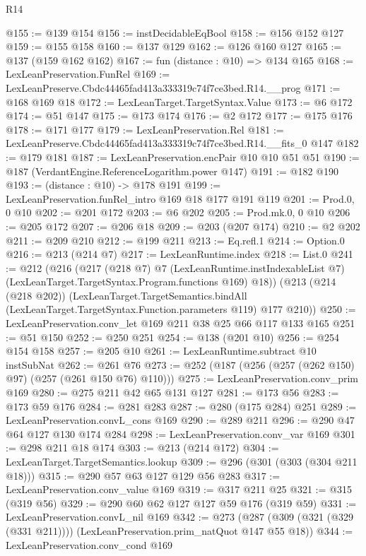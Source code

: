 \begin{lexlean}{R14}
\begin{coremodule}
@155 := @139 @154
@156 := instDecidableEqBool
@158 := @156 @152 @127
@159 := @155 @158
@160 := @137 @129
@162 := @126 @160 @127
@165 := @137 (@159 @162 @162)
@167 := fun (distance : @10) => @134 @165
@168 := LexLeanPreservation.FunRel
@169 := LexLeanPreserve.Cbdc44465fad413a333319c74f7ce3bed.R14.__prog
@171 := @168 @169 @18
@172 := LexLeanTarget.TargetSyntax.Value
@173 := @6 @172
@174 := @51 @147
@175 := @173 @174
@176 := @2 @172
@177 := @175 @176
@178 := @171 @177
@179 := LexLeanPreservation.Rel
@181 := LexLeanPreserve.Cbdc44465fad413a333319c74f7ce3bed.R14.__fits_0 @147
@182 := @179 @181
@187 := LexLeanPreservation.encPair @10 @10 @51 @51
@190 := @187 (VerdantEngine.ReferenceLogarithm.power @147)
@191 := @182 @190
@193 := (distance : @10) -> @178 @191
@199 := LexLeanPreservation.funRel_intro @169 @18 @177 @191 @119
@201 := Prod.{0, 0} @10
@202 := @201 @172
@203 := @6 @202
@205 := Prod.mk.{0, 0} @10
@206 := @205 @172
@207 := @206 @18
@209 := @203 (@207 @174)
@210 := @2 @202
@211 := @209 @210
@212 := @199 @211
@213 := Eq.refl.{1}
@214 := Option.{0}
@216 := @213 (@214 @7)
@217 := LexLeanRuntime.index
@218 := List.{0}
@241 := @212
    (@216
      (@217
        (@218 @7)
        @7
        (LexLeanRuntime.instIndexableList @7)
        (LexLeanTarget.TargetSyntax.Program.functions @169)
        @18))
    (@213
      (@214 (@218 @202))
      (LexLeanTarget.TargetSemantics.bindAll
        (LexLeanTarget.TargetSyntax.Function.parameters @119)
        @177
        @210))
@250 := LexLeanPreservation.conv_let @169 @211 @38 @25 @66 @117 @133 @165
@251 := @51 @150
@252 := @250 @251
@254 := @138 (@201 @10)
@256 := @254 @154 @158
@257 := @205 @10
@261 := LexLeanRuntime.subtract @10 instSubNat
@262 := @261 @76
@273 := @252 (@187 (@256 (@257 (@262 @150) @97) (@257 (@261 @150 @76) @110)))
@275 := LexLeanPreservation.conv_prim @169
@280 := @275 @211 @42 @65 @131 @127
@281 := @173 @56
@283 := @173 @59 @176
@284 := @281 @283
@287 := @280 (@175 @284) @251
@289 := LexLeanPreservation.convL_cons @169
@290 := @289 @211
@296 := @290 @47 @64 @127 @130 @174 @284
@298 := LexLeanPreservation.conv_var @169
@301 := @298 @211 @18 @174
@303 := @213 (@214 @172)
@304 := LexLeanTarget.TargetSemantics.lookup
@309 := @296 (@301 (@303 (@304 @211 @18)))
@315 := @290 @57 @63 @127 @129 @56 @283
@317 := LexLeanPreservation.conv_value @169
@319 := @317 @211 @25
@321 := @315 (@319 @56)
@329 := @290 @60 @62 @127 @127 @59 @176 (@319 @59)
@331 := LexLeanPreservation.convL_nil @169
@342 := @273 (@287 (@309 (@321 (@329 (@331 @211)))) (LexLeanPreservation.prim_natQuot @147 @55 @18))
@344 := LexLeanPreservation.conv_cond @169

\end{coremodule}
\end{lexlean}
